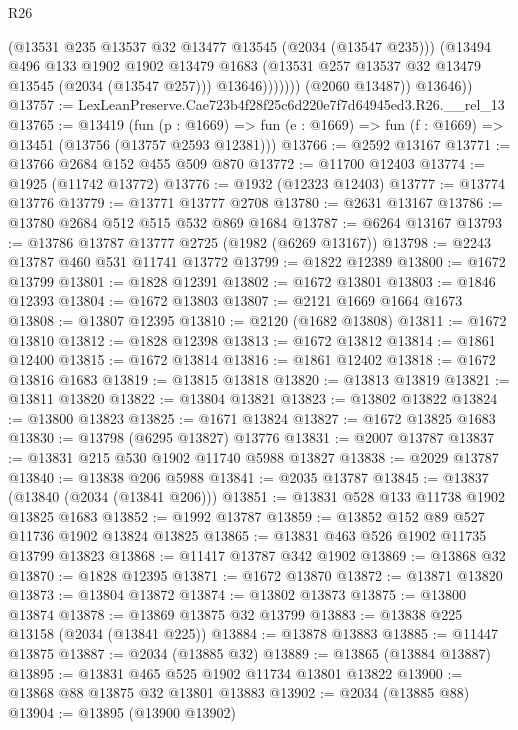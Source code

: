 \begin{lexlean}{R26}
\begin{coremodule}
                      (@13531 @235 @13537 @32 @13477 @13545 (@2034 (@13547 @235)))
                      (@13494
                        @496
                        @133
                        @1902
                        @1902
                        @13479
                        @1683
                        (@13531 @257 @13537 @32 @13479 @13545 (@2034 (@13547 @257)))
                        @13646)))))))
          (@2060 @13487))
        @13646))
@13757 := LexLeanPreserve.Cae723b4f28f25c6d220e7f7d64945ed3.R26.__rel_13
@13765 := @13419
    (fun (p : @1669) => fun (e : @1669) => fun (f : @1669) => @13451 (@13756 (@13757 @2593 @12381)))
@13766 := @2592 @13167
@13771 := @13766 @2684 @152 @455 @509 @870
@13772 := @11700 @12403
@13774 := @1925 (@11742 @13772)
@13776 := @1932 (@12323 @12403)
@13777 := @13774 @13776
@13779 := @13771 @13777 @2708
@13780 := @2631 @13167
@13786 := @13780 @2684 @512 @515 @532 @869 @1684
@13787 := @6264 @13167
@13793 := @13786 @13787 @13777 @2725 (@1982 (@6269 @13167))
@13798 := @2243 @13787 @460 @531 @11741 @13772
@13799 := @1822 @12389
@13800 := @1672 @13799
@13801 := @1828 @12391
@13802 := @1672 @13801
@13803 := @1846 @12393
@13804 := @1672 @13803
@13807 := @2121 @1669 @1664 @1673
@13808 := @13807 @12395
@13810 := @2120 (@1682 @13808)
@13811 := @1672 @13810
@13812 := @1828 @12398
@13813 := @1672 @13812
@13814 := @1861 @12400
@13815 := @1672 @13814
@13816 := @1861 @12402
@13818 := @1672 @13816 @1683
@13819 := @13815 @13818
@13820 := @13813 @13819
@13821 := @13811 @13820
@13822 := @13804 @13821
@13823 := @13802 @13822
@13824 := @13800 @13823
@13825 := @1671 @13824
@13827 := @1672 @13825 @1683
@13830 := @13798 (@6295 @13827) @13776
@13831 := @2007 @13787
@13837 := @13831 @215 @530 @1902 @11740 @5988 @13827
@13838 := @2029 @13787
@13840 := @13838 @206 @5988
@13841 := @2035 @13787
@13845 := @13837 (@13840 (@2034 (@13841 @206)))
@13851 := @13831 @528 @133 @11738 @1902 @13825 @1683
@13852 := @1992 @13787
@13859 := @13852 @152 @89 @527 @11736 @1902 @13824 @13825
@13865 := @13831 @463 @526 @1902 @11735 @13799 @13823
@13868 := @11417 @13787 @342 @1902
@13869 := @13868 @32
@13870 := @1828 @12395
@13871 := @1672 @13870
@13872 := @13871 @13820
@13873 := @13804 @13872
@13874 := @13802 @13873
@13875 := @13800 @13874
@13878 := @13869 @13875 @32 @13799
@13883 := @13838 @225 @13158 (@2034 (@13841 @225))
@13884 := @13878 @13883
@13885 := @11447 @13875
@13887 := @2034 (@13885 @32)
@13889 := @13865 (@13884 @13887)
@13895 := @13831 @465 @525 @1902 @11734 @13801 @13822
@13900 := @13868 @88 @13875 @32 @13801 @13883
@13902 := @2034 (@13885 @88)
@13904 := @13895 (@13900 @13902)

\end{coremodule}
\end{lexlean}
